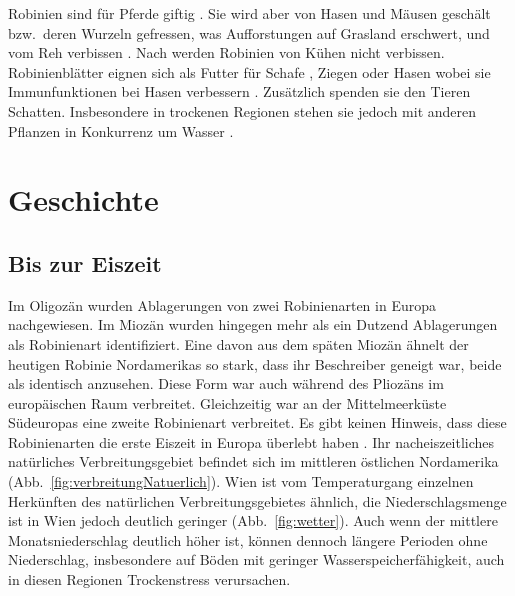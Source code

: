 \documentclass[twocolumn]{scrartcl}
\begin{document}
Robinien sind für Pferde giftig \citep{grosche2008robiniePferd}. Sie
wird aber von Hasen und Mäusen geschält bzw.\ deren Wurzeln gefressen,
was Aufforstungen auf Grasland erschwert, und vom Reh verbissen
\citep{barta2023robinieReh}. Nach \cite{berner2018robinie} werden
Robinien von Kühen nicht verbissen. Robinienblätter eignen sich als
Futter für Schafe \citep{ganai2009robnieSchaf}, Ziegen
\citep{papachristou1999robinieZiege} oder Hasen
\citep{singh2010robnieHasennahrung} wobei sie Immunfunktionen bei
Hasen verbessern \citep{yang2017robinieHasen}.
Zusätzlich spenden sie den Tieren Schatten.
Insbesondere in trockenen Regionen stehen sie jedoch mit anderen Pflanzen in Konkurrenz um Wasser \citep{halasz2021robinieAlsTierutter}.

\section{Geschichte}

\subsection{Bis zur Eiszeit}

Im Oligozän wurden Ablagerungen von zwei Robinienarten in Europa nachgewiesen.
Im Miozän wurden hingegen mehr als ein Dutzend Ablagerungen als Robinienart
identifiziert. Eine davon aus dem späten Miozän ähnelt der heutigen Robinie
Nordamerikas so stark, dass ihr Beschreiber geneigt war, beide als identisch
anzusehen. Diese Form war auch während des Pliozäns im europäischen Raum
verbreitet. Gleichzeitig war an der Mittelmeerküste Südeuropas eine zweite
Robinienart verbreitet. Es gibt keinen Hinweis, dass diese Robinienarten die
erste Eiszeit in Europa überlebt haben \citep{berry1918robinie}. Ihr
nacheiszeitliches natürliches Verbreitungsgebiet befindet sich im mittleren
östlichen Nordamerika (Abb.~\ref{fig:verbreitungNatuerlich}). Wien ist vom
Temperaturgang einzelnen Herkünften des natürlichen Verbreitungsgebietes
ähnlich, die Niederschlagsmenge ist in Wien jedoch deutlich geringer
(Abb.~\ref{fig:wetter}). Auch wenn der mittlere Monatsniederschlag deutlich
höher ist, können dennoch längere Perioden ohne Niederschlag, insbesondere auf
Böden mit geringer Wasserspeicherfähigkeit, auch in diesen Regionen
Trockenstress verursachen.
\end{document}
